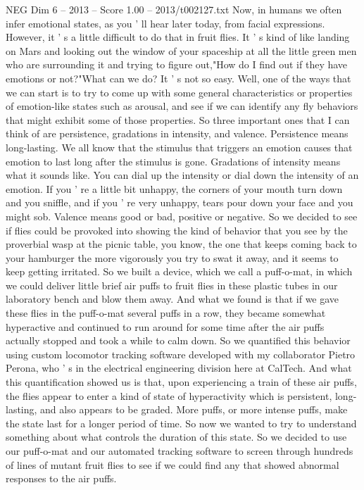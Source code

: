 \begin{textsample}{NEG Dim 6 – 2013 – Score 1.00 – 2013/t002127.txt}
Now, in humans we often infer emotional states, as you ' ll hear later today, from facial expressions.
However, it ' s a little difficult to do that in fruit flies.
It ' s kind of like landing on Mars and looking out the window of your spaceship at all the little green men who are surrounding it and trying to figure out,"How do I find out if they have emotions or not?"What can we do?
It ' s not so easy.
Well, one of the ways that we can start is to try to come up with some general characteristics or properties of emotion-like states such as arousal, and see if we can identify any fly behaviors that might exhibit some of those properties.
So three important ones that I can think of are persistence, gradations in intensity, and valence.
Persistence means long-lasting.
We all know that the stimulus that triggers an emotion causes that emotion to last long after the stimulus is gone.
Gradations of intensity means what it sounds like.
You can dial up the intensity or dial down the intensity of an emotion.
If you ' re a little bit unhappy, the corners of your mouth turn down and you sniffle, and if you ' re very unhappy, tears pour down your face and you might sob.
Valence means good or bad, positive or negative.
So we decided to see if flies could be provoked into showing the kind of behavior that you see by the proverbial wasp at the picnic table, you know, the one that keeps coming back to your hamburger the more vigorously you try to swat it away, and it seems to keep getting irritated.
So we built a device, which we call a puff-o-mat, in which we could deliver little brief air puffs to fruit flies in these plastic tubes in our laboratory bench and blow them away.
And what we found is that if we gave these flies in the puff-o-mat several puffs in a row, they became somewhat hyperactive and continued to run around for some time after the air puffs actually stopped and took a while to calm down.
So we quantified this behavior using custom locomotor tracking software developed with my collaborator Pietro Perona, who ' s in the electrical engineering division here at CalTech.
And what this quantification showed us is that, upon experiencing a train of these air puffs, the flies appear to enter a kind of state of hyperactivity which is persistent, long-lasting, and also appears to be graded.
More puffs, or more intense puffs, make the state last for a longer period of time.
So now we wanted to try to understand something about what controls the duration of this state.
So we decided to use our puff-o-mat and our automated tracking software to screen through hundreds of lines of mutant fruit flies to see if we could find any that showed abnormal responses to the air puffs.

\end{textsample}

